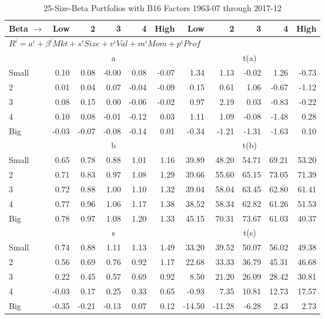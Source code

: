
\begin{table}[!ht]
\footnotesize
\centering
\caption{25-Size-Beta Portfolios with B16 Factors 1963-07 through 2017-12}
\begin{tabular}{lrrrrrrrrrr}
  \toprule
    
    Beta $\rightarrow$ & Low & 2 & 3 & 4 & High & Low & 2 & 3 & 4 & High  \\ 
  \midrule
  \multicolumn{11}{l}{$R^i=a^i+\beta^iMkt+s^iSize+v^iVal+m^iMom+p^iProf$}  \\
  
     & \multicolumn{5}{c}{a} & \multicolumn{5}{c}{t(a)}   \\
     \cmidrule(r){2-6} \cmidrule(r){7-11} 
    Small  & 0.10  & 0.08  & -0.00  & 0.08  & -0.07  & 1.34  & 1.13  & -0.02  & 1.26  & -0.73   \\
    2  & 0.01  & 0.04  & 0.07  & -0.04  & -0.09  & 0.15  & 0.61  & 1.06  & -0.67  & -1.12   \\
    3  & 0.08  & 0.15  & 0.00  & -0.06  & -0.02  & 0.97  & 2.19  & 0.03  & -0.83  & -0.22   \\
    4  & 0.10  & 0.08  & -0.01  & -0.12  & 0.03  & 1.11  & 1.09  & -0.08  & -1.48  & 0.28   \\
    Big  & -0.03  & -0.07  & -0.08  & -0.14  & 0.01  & -0.34  & -1.21  & -1.31  & -1.63  & 0.10   \\
    
  
     & \multicolumn{5}{c}{b} & \multicolumn{5}{c}{t(b)}   \\
     \cmidrule(r){2-6} \cmidrule(r){7-11} 
    Small  & 0.65  & 0.78  & 0.88  & 1.01  & 1.16  & 39.89  & 48.20  & 54.71  & 69.21  & 53.20   \\
    2  & 0.71  & 0.83  & 0.97  & 1.08  & 1.29  & 39.66  & 55.60  & 65.15  & 73.05  & 71.39   \\
    3  & 0.72  & 0.88  & 1.00  & 1.10  & 1.32  & 39.04  & 58.04  & 63.45  & 62.80  & 61.41   \\
    4  & 0.77  & 0.96  & 1.06  & 1.17  & 1.38  & 38.52  & 58.34  & 62.82  & 61.26  & 51.53   \\
    Big  & 0.78  & 0.97  & 1.08  & 1.20  & 1.33  & 45.15  & 70.31  & 73.67  & 61.03  & 40.37   \\
    
  
     & \multicolumn{5}{c}{s} & \multicolumn{5}{c}{t(s)}   \\
     \cmidrule(r){2-6} \cmidrule(r){7-11} 
    Small  & 0.74  & 0.88  & 1.11  & 1.13  & 1.49  & 33.20  & 39.52  & 50.07  & 56.02  & 49.38   \\
    2  & 0.56  & 0.69  & 0.76  & 0.92  & 1.17  & 22.68  & 33.33  & 36.79  & 45.31  & 46.68   \\
    3  & 0.22  & 0.45  & 0.57  & 0.69  & 0.92  & 8.50  & 21.20  & 26.09  & 28.42  & 30.81   \\
    4  & -0.03  & 0.17  & 0.25  & 0.33  & 0.65  & -0.93  & 7.35  & 10.81  & 12.73  & 17.57   \\
    Big  & -0.35  & -0.21  & -0.13  & 0.07  & 0.12  & -14.50  & -11.28  & -6.28  & 2.43  & 2.73   \\
    

\end{tabular}
\end{table}
